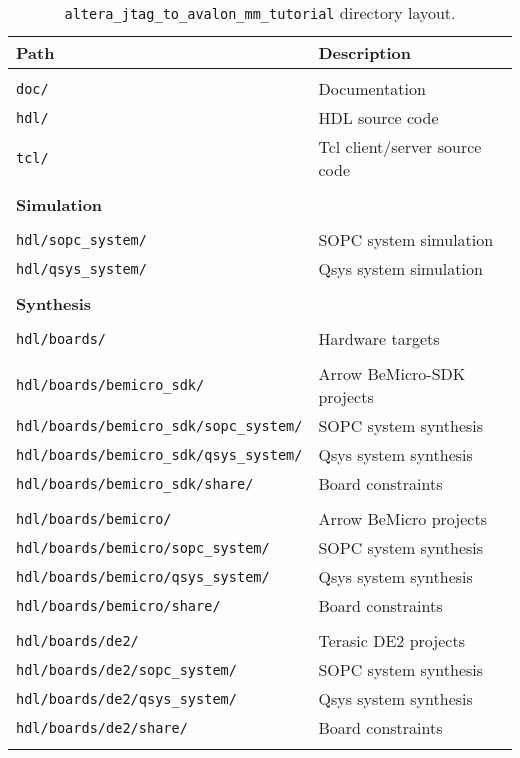 \documentclass[10pt,twoside]{article}
\begin{document}
%
\begin{table}[t]
\caption{{\tt altera\_jtag\_to\_avalon\_mm\_tutorial} directory layout.}
\label{tab:directory_layout}
\begin{center}
\begin{tabular}{|l|l|}
\hline
Path & Description\\
\hline
&\\
\verb+doc/+ & Documentation\\
\verb+hdl/+ & HDL source code\\
\verb+tcl/+ & Tcl client/server source code\\
&\\
\hline
\multicolumn{2}{|l|}{\bf Simulation}\\
\hline
&\\
\verb+hdl/sopc_system/+ & SOPC system simulation\\
\verb+hdl/qsys_system/+ & Qsys system simulation\\
&\\
\hline
\multicolumn{2}{|l|}{\bf Synthesis}\\
\hline
&\\
\verb+hdl/boards/+      & Hardware targets\\
&\\
\verb+hdl/boards/bemicro_sdk/+             & Arrow BeMicro-SDK projects\\
\verb+hdl/boards/bemicro_sdk/sopc_system/+ & SOPC system synthesis\\
\verb+hdl/boards/bemicro_sdk/qsys_system/+ & Qsys system synthesis\\
\verb+hdl/boards/bemicro_sdk/share/+       & Board constraints\\
&\\
\verb+hdl/boards/bemicro/+             & Arrow BeMicro projects\\
\verb+hdl/boards/bemicro/sopc_system/+ & SOPC system synthesis\\
\verb+hdl/boards/bemicro/qsys_system/+ & Qsys system synthesis\\
\verb+hdl/boards/bemicro/share/+       & Board constraints\\
&\\
\verb+hdl/boards/de2/+             & Terasic DE2 projects\\
\verb+hdl/boards/de2/sopc_system/+ & SOPC system synthesis\\
\verb+hdl/boards/de2/qsys_system/+ & Qsys system synthesis\\
\verb+hdl/boards/de2/share/+       & Board constraints\\
&\\
\hline
\end{tabular}
\end{center}
\end{table}
\end{document}
